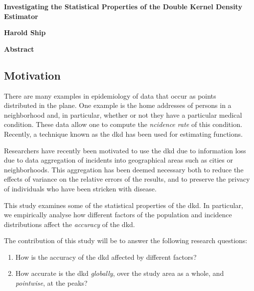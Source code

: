 


\begin{onehalfspace}

\begin{center}
    \vspace*{0.5cm}

    \textbf{\Large Investigating the Statistical Properties of the Double Kernel Density Estimator}

    \vspace*{1.0cm}

    \textbf{Harold Ship}

    \vspace*{1.0cm}

\end{center}

\noindent\textbf{\LARGE Abstract}

\subsection*{Motivation}

There are many examples in epidemiology of data that occur as points distributed in the plane.
One example is
the home addresses of persons in a neighborhood and,
in particular, whether or not they have a particular medical condition.
These data allow one to compute the \textit{ncidence rate} of this condition.
Recently,
a technique known as the \acrfull{dkd} has been used for estimating  functions.

Researchers have recently been motivated to use the \acrshort{dkd} due to information loss due to data aggregation of incidents into geographical areas such as cities or neighborhoods.
This aggregation has been deemed necessary both
to reduce the effects of variance on the relative errors of the results,
and to preserve the privacy of individuals who have been stricken with disease.

This study examines some of the statistical properties of the \acrshort{dkd}.
In particular,
we empirically analyse how different factors of the population and incidence distributions
affect the \textit{accuracy} of the \acrshort{dkd}.

The contribution of this study will be to answer the following research questions:
\begin{enumerate}
    \item How is the accuracy of the \acrshort{dkd} affected by different factors?
    \item How accurate is the \acrshort{dkd} \textit{globally},
        over the study area as a whole,
        and \textit{pointwise}, at the peaks?
\end{enumerate}


\end{onehalfspace}
